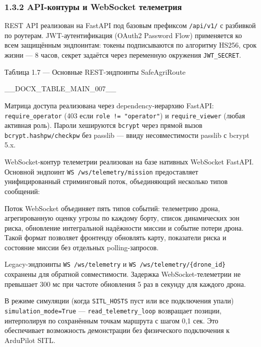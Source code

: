 \documentclass[14pt,a4paper]{extarticle}
\begin{document}
\hypertarget{api-ux43aux43eux43dux442ux443ux440ux44b-ux438-websocket-ux442ux435ux43bux435ux43cux435ux442ux440ux438ux44f}{%
\subsubsection{1.3.2 API-контуры и WebSocket телеметрия}\label{api-ux43aux43eux43dux442ux443ux440ux44b-ux438-websocket-ux442ux435ux43bux435ux43cux435ux442ux440ux438ux44f}}

REST API реализован на FastAPI под базовым префиксом \texttt{/api/v1/} с разбивкой по роутерам. JWT-аутентификация (OAuth2 Password Flow) применяется ко всем защищённым эндпоинтам: токены подписываются по алгоритму HS256, срок жизни --- 8 часов, секрет задаётся через переменную окружения \texttt{JWT\_SECRET}.

Таблица 1.7 --- Основные REST-эндпоинты SafeAgriRoute



__DOCX_TABLE_MAIN_007__



Матрица доступа реализована через dependency-иерархию FastAPI: \texttt{require\_operator} (403 если \texttt{role\ !=\ "operator"}) и \texttt{require\_viewer} (любая активная роль). Пароли хешируются \texttt{bcrypt} через прямой вызов \texttt{bcrypt.hashpw/checkpw} без passlib --- ввиду несовместимости passlib с bcrypt 5.x.

WebSocket-контур телеметрии реализован на базе нативных WebSocket FastAPI. Основной эндпоинт \texttt{WS\ /ws/telemetry/mission} предоставляет унифицированный стриминговый поток, объединяющий несколько типов сообщений:

Поток WebSocket объединяет пять типов событий: телеметрию дрона, агрегированную оценку угрозы по каждому борту, список динамических зон риска, обновление интегральной надёжности миссии и событие потери дрона. Такой формат позволяет фронтенду обновлять карту, показатели риска и состояние миссии без отдельных polling-запросов.


Legacy-эндпоинты \texttt{WS\ /ws/telemetry} и \texttt{WS\ /ws/telemetry/\{drone\_id\}} сохранены для обратной совместимости. Задержка WebSocket-телеметрии не превышает 300 мс при частоте обновления 5 раз в секунду для каждого дрона.

В режиме симуляции (когда \texttt{SITL\_HOSTS} пуст или все подключения упали) \texttt{simulation\_mode=True} --- \texttt{read\_telemetry\_loop} возвращает позиции, интерполируя по сохранённым точкам маршрута с шагом 0,1 сек. Это обеспечивает возможность демонстрации без физического подключения к ArduPilot SITL.
\end{document}
